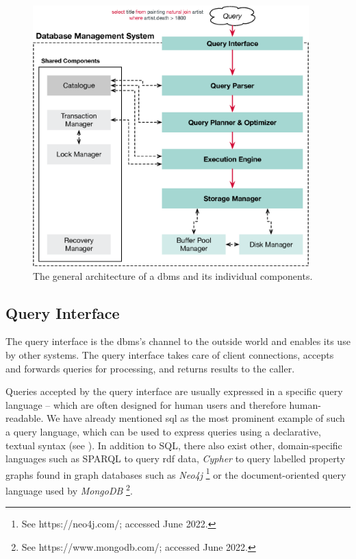 \begin{figure}[tb]
    \centering
    \includegraphics[width=0.95\textwidth]{figures/dbms-architecture.eps}
    \caption{The general architecture of a \acrshort{dbms} and its individual components.}
    \label{figure:dbms-architecture}
\end{figure}

\subsection{Query Interface}

The query interface is the \acrshort{dbms}'s channel to the outside world and enables its use by other systems. The query interface takes care of client connections, accepts and forwards queries for processing, and returns results to the caller.

Queries accepted by the query interface are usually expressed in a specific query language -- which are often designed for human users and therefore human-readable. We have already mentioned \acrshort{sql} \cite{XOpen:1996SQL,Chamberlin:2012Early} as the most prominent example of such a query language, which can be used to express queries using a declarative, textual syntax (see ). In addition to SQL, there also exist other, domain-specific languages such as SPARQL \cite{Perez:2009Semantics} to query \acrfull{rdf} data, \emph{Cypher} to query labelled property graphs \cite{Francis:2018Cypher} found in graph databases such as \emph{Neo4j} \footnote{See https://neo4j.com/; accessed June 2022.} or the document-oriented query language used by \emph{MongoDB} \footnote{See https://www.mongodb.com/; accessed June 2022.}.

